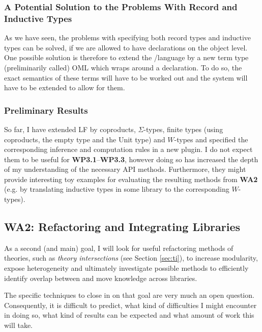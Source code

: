\subsubsection{A Potential Solution to the Problems With Record and Inductive Types}
As we have seen, the problems with specifying both record types and inductive types can be solved, if we are allowed to have declarations on the object level. One possible solution is therefore to extend the \omdoc/\mmt language by a new term type (preliminarily called) \textsf{OML} which wraps around a declaration. To do so, the exact semantics of these terms will have to be worked out and the \mmt system will have to be extended to allow for them.

\subsubsection{Preliminary Results}
So far, I have extended LF by coproducts, $\Sigma$-types, finite types (using coproducts, the empty type and the Unit type) and $W$-types and specified the corresponding inference and computation rules in a new \mmt plugin. I do not expect them to be useful for \textbf{WP3.1}--\textbf{WP3.3}, however doing so has increased the depth of my understanding of the necessary \mmt API methods. Furthermore, they might provide interesting toy examples for evaluating the resulting methods from \textbf{WA2} (e.g. by translating inductive types in some library to the corresponding $W$-types).

\subsection{\textbf{WA2}: Refactoring and Integrating Libraries}\label{sec:WPBC}

As a second (and main) goal, I will look for useful refactoring methods of theories, such as \emph{theory intersections} (see Section \ref{sec:ti}), to increase modularity, expose heterogeneity and ultimately investigate possible methods to efficiently identify overlap between and move knowledge across libraries.

The specific techniques to close in on that goal are very much an open question. Consequently, it is difficult to predict, what kind of difficulties I might encounter in doing so, what kind of results can be expected and what amount of work this will take.

